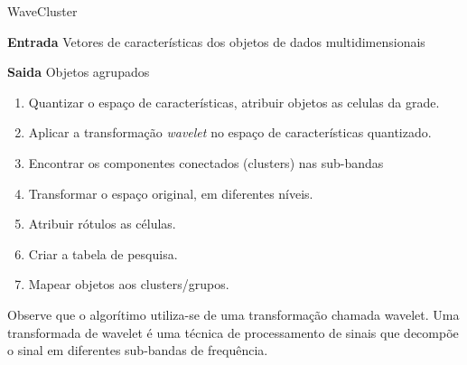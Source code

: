 \begin{algorithm}
\caption{WaveCluster}
\textbf{Entrada} Vetores de características dos objetos de dados multidimensionais

\textbf{Saida} Objetos agrupados
\begin{enumerate}
\item Quantizar o espaço de características, atribuir objetos as celulas da grade.
\item Aplicar a transformação \textit{wavelet} no espaço de características quantizado.
\item Encontrar os componentes conectados (clusters) nas sub-bandas
\item Transformar o espaço original, em diferentes níveis.
\item Atribuir rótulos as células.
\item Criar a tabela de pesquisa.
\item Mapear objetos aos clusters/grupos.
\end{enumerate}
\end{algorithm}

Observe que o algorítimo utiliza-se de uma transformação chamada wavelet. Uma transformada de wavelet é uma técnica de processamento de sinais que decompõe o sinal em diferentes sub-bandas de frequência. 
	